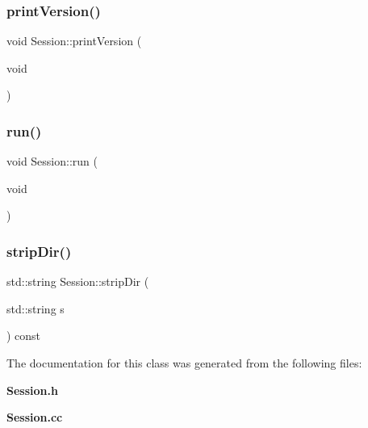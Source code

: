 \mbox{\label{classSession_affb71fbe27ffa10023d95cc0205e2123}} 
\subsubsection{print\+Version()}
{\footnotesize\ttfamily void Session\+::print\+Version (\begin{DoxyParamCaption}\item[{void}]{ }\end{DoxyParamCaption})\hspace{0.3cm}{\ttfamily [private]}}

\mbox{\label{classSession_ad9818ac55ea28a0bed326d65f0c92490}} 
\subsubsection{run()}
{\footnotesize\ttfamily void Session\+::run (\begin{DoxyParamCaption}\item[{void}]{ }\end{DoxyParamCaption})}

\mbox{\label{classSession_a2d52d2612389a20481adaa2ce696fc26}} 
\subsubsection{strip\+Dir()}
{\footnotesize\ttfamily std\+::string Session\+::strip\+Dir (\begin{DoxyParamCaption}\item[{std\+::string}]{s }\end{DoxyParamCaption}) const\hspace{0.3cm}{\ttfamily [private]}}



The documentation for this class was generated from the following files\+:\begin{DoxyCompactItemize}
\item 
\textbf{ Session.\+h}\item 
\textbf{ Session.\+cc}\end{DoxyCompactItemize}
